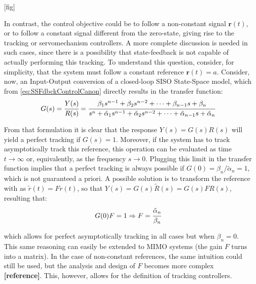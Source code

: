 \documentclass[a4paper,11pt]{book}
\numberwithin{figure}{chapter}
\numberwithin{equation}{chapter}
\numberwithin{table}{chapter}
\theoremstyle{definition}
\begin{document}
[fig]

In contrast, the control objective could be to follow a non-constant signal $\bm{r}(t)$, or to follow a constant signal different from the zero-state, giving rise to the tracking or servomechanism controllers. A more complete discussion is needed in such cases, since there is a possibility that state-feedback is not capable of actually performing this tracking. To understand this question, consider, for simplicity, that the system must follow a constant reference $\bm{r}(t) = a$. Consider, now, an Input-Output conversion of a closed-loop SISO State-Space model, which from \eqref{eq:SSFdbckControlCanon} directly results in the transfer function:
\begin{equation}
	G(s) = \cfrac{Y(s)}{R(s)} = \cfrac{\beta_1 s^{n-1} + \beta_2 s^{n-2} + \cdots + \beta_{n-1} s + \beta_n}{s^{n} + \tilde{\alpha}_1 s^{n-1} + \tilde{\alpha}_2 s^{n-2} + \cdots + \tilde{\alpha}_{n-1} s + \tilde{\alpha}_n}
\end{equation}

From that formulation it is clear that the response $Y(s) = G(s)R(s)$ will yield a perfect tracking if $G(s) = 1$. Moreover, if the system has to track asymptotically track this reference, this operation can be evaluated as time $t \to \infty$ or, equivalently, as the frequency $s \to 0$. Plugging this limit in the transfer function implies that a perfect tracking is always possible if $G(0) = \beta_n /  \tilde{\alpha}_n = 1$, which is not guaranteed a priori. A possible solution is to transform the reference with as $\tilde{r}(t) = F r(t)$, so that $Y(s) = G(s)\tilde{R}(s) = G(s) F R(s)$, resulting that:
\begin{equation}
	G(0) F = 1 \Rightarrow F = \cfrac{\tilde{\alpha}_n}{\beta_n}
\end{equation}

\noindent which allows for perfect asymptotically tracking in all cases but when $\beta_n = 0$. This same reasoning can easily be extended to MIMO systems (the gain $F$ turns into a matrix). In the case of non-constant references, the same intuition could still be used, but the analysis and design of $F$ becomes more complex \textbf{[reference]}. This, however, allows for the definition of tracking controllers.
\end{document}
